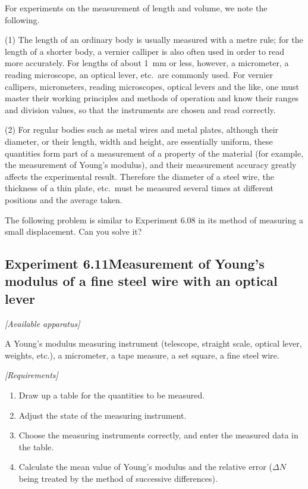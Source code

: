 \begin{commentary}
For experiments on the measurement of length and volume, we note the following.

(1) The length of an ordinary body is usually measured with a metre rule; for the length of a shorter body, a vernier calliper is also often used in order to read more accurately. For lengths of about \SI{1}{mm} or less, however, a micrometer, a reading microscope, an optical lever, etc.\ are commonly used. For vernier callipers, micrometers, reading microscopes, optical levers and the like, one must master their working principles and methods of operation and know their ranges and division values, so that the instruments are chosen and read correctly.

(2) For regular bodies such as metal wires and metal plates, although their diameter, or their length, width and height, are essentially uniform, these quantities form part of a measurement of a property of the material (for example, the measurement of Young's modulus), and their measurement accuracy greatly affects the experimental result. Therefore the diameter of a steel wire, the thickness of a thin plate, etc.\ must be measured several times at different positions and the average taken.

The following problem is similar to Experiment 6.08 in its method of measuring a small displacement. Can you solve it?
\end{commentary}

\subsection*{Experiment 6.11\quad Measurement of Young's modulus of a fine steel wire with an optical lever}

\noindent\textit{[Available apparatus]}

A Young's modulus measuring instrument (telescope, straight scale, optical lever, weights, etc.), a micrometer, a tape measure, a set square, a fine steel wire.

\noindent\textit{[Requirements]}
\begin{enumerate}[label=(\arabic*),leftmargin=2.2em,itemsep=1pt,topsep=2pt]
\item Draw up a table for the quantities to be measured.
\item Adjust the state of the measuring instrument.
\item Choose the measuring instruments correctly, and enter the measured data in the table.
\item Calculate the mean value of Young's modulus and the relative error ($\Delta N$ being treated by the method of successive differences).
\end{enumerate}

